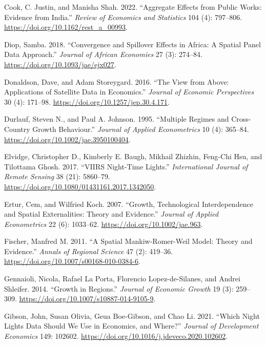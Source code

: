\documentclass[
  letterpaper,
  DIV=11,
  numbers=noendperiod]{scrartcl}
\newlength{\cslhangindent}
\newenvironment{CSLReferences}[2] %
 {\begin{list}{}{%
  \setlength{\itemindent}{0pt}
  \setlength{\leftmargin}{0pt}
  \setlength{\parsep}{0pt}
  \ifodd #1
   \setlength{\leftmargin}{\cslhangindent}
   \setlength{\itemindent}{-1\cslhangindent}
  \fi
  \setlength{\itemsep}{#2\baselineskip}}}
 {\end{list}}
\begin{document}
\begin{CSLReferences}{1}{0}
Cook, C. Justin, and Manisha Shah. 2022. {``Aggregate Effects from
Public Works: Evidence from {India}.''} \emph{Review of Economics and
Statistics} 104 (4): 797--806.
\url{https://doi.org/10.1162/rest_a_00993}.

Diop, Samba. 2018. {``Convergence and Spillover Effects in {Africa}: A
Spatial Panel Data Approach.''} \emph{Journal of African Economies} 27
(3): 274--84. \url{https://doi.org/10.1093/jae/ejx027}.

Donaldson, Dave, and Adam Storeygard. 2016. {``The View from Above:
Applications of Satellite Data in Economics.''} \emph{Journal of
Economic Perspectives} 30 (4): 171--98.
\url{https://doi.org/10.1257/jep.30.4.171}.

Durlauf, Steven N., and Paul A. Johnson. 1995. {``Multiple Regimes and
Cross-Country Growth Behaviour.''} \emph{Journal of Applied
Econometrics} 10 (4): 365--84.
\url{https://doi.org/10.1002/jae.3950100404}.

Elvidge, Christopher D., Kimberly E. Baugh, Mikhail Zhizhin, Feng-Chi
Hsu, and Tilottama Ghosh. 2017. {``{VIIRS} Night-Time Lights.''}
\emph{International Journal of Remote Sensing} 38 (21): 5860--79.
\url{https://doi.org/10.1080/01431161.2017.1342050}.

Ertur, Cem, and Wilfried Koch. 2007. {``Growth, Technological
Interdependence and Spatial Externalities: Theory and Evidence.''}
\emph{Journal of Applied Econometrics} 22 (6): 1033--62.
\url{https://doi.org/10.1002/jae.963}.

Fischer, Manfred M. 2011. {``A Spatial {Mankiw-Romer-Weil} Model: Theory
and Evidence.''} \emph{Annals of Regional Science} 47 (2): 419--36.
\url{https://doi.org/10.1007/s00168-010-0384-6}.

Gennaioli, Nicola, Rafael La Porta, Florencio Lopez-de-Silanes, and
Andrei Shleifer. 2014. {``Growth in Regions.''} \emph{Journal of
Economic Growth} 19 (3): 259--309.
\url{https://doi.org/10.1007/s10887-014-9105-9}.

Gibson, John, Susan Olivia, Geua Boe-Gibson, and Chao Li. 2021. {``Which
Night Lights Data Should We Use in Economics, and Where?''}
\emph{Journal of Development Economics} 149: 102602.
\url{https://doi.org/10.1016/j.jdeveco.2020.102602}.


\end{CSLReferences}
\end{document}
